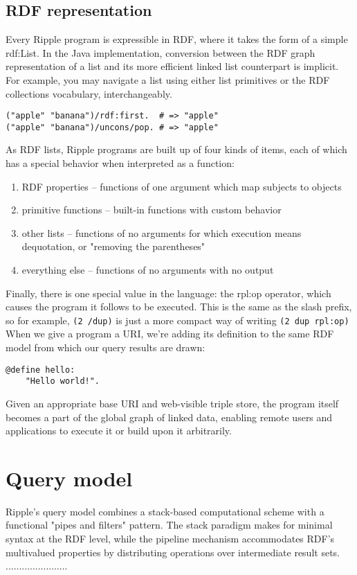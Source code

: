 \documentclass[runningheads]{llncs}
\begin{document}
\subsection{RDF representation}
Every Ripple program is expressible in RDF, where it takes the form of a simple rdf:List.  In the Java implementation, conversion between the RDF graph representation of a list and its more efficient linked list counterpart is implicit.  For example, you may navigate a list using either list primitives or the RDF collections vocabulary, interchangeably.
\begin{verbatim}
("apple" "banana")/rdf:first.  # => "apple"
("apple" "banana")/uncons/pop. # => "apple"
\end{verbatim}
As RDF lists, Ripple programs are built up of four kinds of items, each of which has a special behavior when interpreted as a function:
\begin{enumerate}
\item RDF properties -- functions of one argument which map subjects to objects
\item primitive functions -- built-in functions with custom behavior
\item other lists -- functions of no arguments for which execution means dequotation, or "removing the parentheses"
\item everything else -- functions of no arguments with no output
\end{enumerate}
Finally, there is one special value in the language: the rpl:op operator, which causes the program it follows to be executed.  This is the same as the slash prefix, so for example, \texttt{(2 /dup)} is just a more compact way of writing \texttt{(2 dup rpl:op)}
When we give a program a URI, we're adding its definition to the same RDF model from which our query results are drawn:
\begin{verbatim}
@define hello:
    "Hello world!".
\end{verbatim}
Given an appropriate base URI and web-visible triple store, the program itself becomes a part of the global graph of linked data, enabling remote users and applications to execute it or build upon it arbitrarily.


\section{Query model}

Ripple's query model combines a stack-based computational scheme with a functional "pipes and filters" pattern.  The stack paradigm makes for minimal syntax at the RDF level, while the pipeline mechanism accommodates RDF's multivalued properties by distributing operations over intermediate result sets.
.......................
\end{document}

